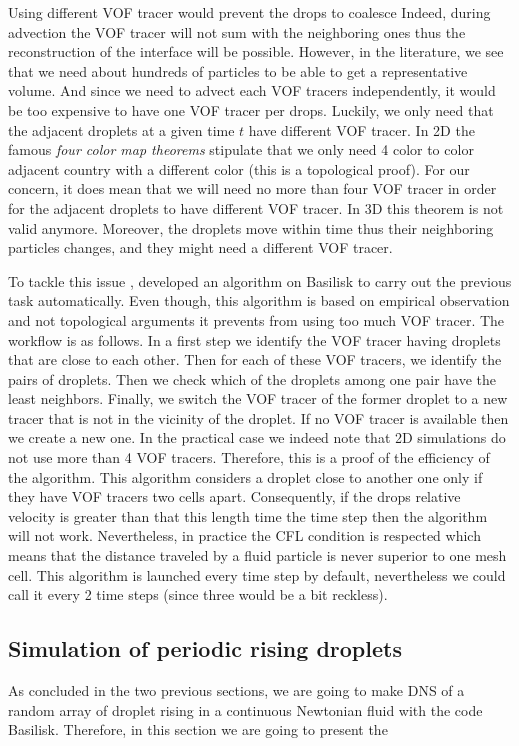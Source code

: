 Using different VOF tracer would prevent the drops to coalesce 
Indeed, during advection the VOF tracer will not sum with the neighboring ones thus the reconstruction of the interface will be possible. 
However, in the literature, we see that we need about hundreds of particles to be able to get a representative volume. 
And since we need to advect each VOF tracers independently, it would be too expensive to have one VOF tracer per drops.    
Luckily, we only need that the adjacent droplets at a given time $t$ have different VOF tracer. 
In 2D the famous \textit{four color map theorems} stipulate that we only need 4 color to color adjacent country with a different color (this is a topological proof).
For our concern, it does mean that we will need no more than four VOF tracer in order for the adjacent droplets to have different VOF tracer. 
In 3D this theorem is not valid anymore. 
Moreover, the droplets move within time thus their neighboring particles changes, and they might need a different VOF tracer.

To tackle this issue \citet{mani2021numerical}, developed an algorithm on Basilisk to carry out the previous task automatically. 
Even though, this algorithm is based on empirical observation and not topological arguments it prevents from using too much VOF tracer. 
The workflow is as follows.
In a first step we identify the VOF tracer having droplets that are close to each other. 
Then for each of these VOF tracers, we identify the pairs of droplets. 
Then we check which of the droplets among one pair have the least neighbors. 
Finally, we switch the VOF tracer of the former droplet to a new tracer that is not in the vicinity of the droplet. 
If no VOF tracer is available then we create a new one. 
In the practical case we indeed note that 2D simulations do not use more than 4 VOF tracers. 
Therefore, this is a proof of the efficiency of the algorithm. 
This algorithm considers a droplet close to another one only if they have VOF tracers two cells apart.
Consequently, if the drops relative velocity is greater than that this length time the time step then the algorithm will not work.
Nevertheless, in practice the CFL condition is respected which means that the distance traveled by a fluid particle is never superior to one mesh cell. 
This algorithm is launched every time step by default, nevertheless we could call it every 2 time steps (since three would be a bit reckless). 


\subsection{Simulation of periodic rising droplets}
As concluded in the two previous sections, we are going to make DNS of a random array of droplet rising in a continuous Newtonian fluid with the code Basilisk. 
Therefore, in this section we are going to present the 


